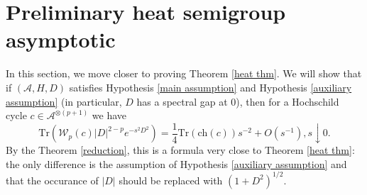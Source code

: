 \section{Preliminary heat semigroup asymptotic}\label{preliminary heat section}

    In this section, we move closer to proving Theorem \ref{heat thm}.
    We will show that if $(\mathcal{A},H,D)$ satisfies Hypothesis \ref{main assumption} and Hypothesis \ref{auxiliary assumption} {(in particular, $D$ has a spectral gap at $0$)}, then for a Hochschild cycle $c \in \mathcal{A}^{\otimes(p+1)}$
    we have 
    \begin{equation}\label{prelim heat asymptotic}
        \mathrm{Tr}(\mathcal{W}_p(c)|D|^{2-p}e^{-s^2D^2}) = \frac14\mathrm{Tr}(\mathrm{ch}(c))s^{-2}+O(s^{-1}), s\downarrow 0.
    \end{equation}
    By the Theorem \ref{reduction}, this is a formula very close to Theorem \ref{heat thm}: the only difference is the assumption of Hypothesis \ref{auxiliary assumption} and that the occurance of $|D|$ should be replaced with $(1+D^2)^{1/2}.$ 
    
